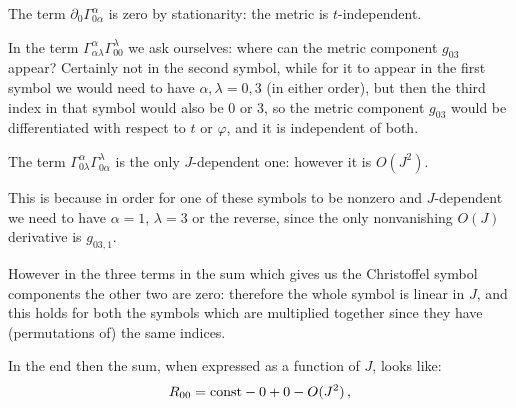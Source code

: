 \documentclass[main.tex]{subfiles}
\begin{document}
The term \(\partial_{0} \Gamma^{\alpha }_{0\alpha }\) is zero by stationarity: the metric is \(t\)-independent. 

In the term \(\Gamma^{\alpha }_{\alpha \lambda } \Gamma^{\lambda }_{00}\) we ask ourselves: where can the metric component \(g_{03}\) appear? Certainly not in the second symbol, while for it to appear in the first symbol we would need to have \(\alpha, \lambda = 0, 3\) (in either order), but then the third index in that symbol would also be \(0\) or \(3\), so the metric component \(g_{03}\) would be differentiated with respect to \(t\) or \(\varphi \), and it is independent of both. 

The term \(\Gamma^{\alpha }_{0 \lambda } \Gamma^{\lambda}_{0 \alpha }\) is the only \(J\)-dependent one: however it is \(O(J^2)\). 

This is because in order for one of these symbols to be nonzero and \(J\)-dependent we need to have \(\alpha = 1\), \(\lambda = 3\) or the reverse, since the only nonvanishing \(O(J)\) derivative is \(g_{03,1}\). 

However in the three terms in the sum which gives us the Christoffel symbol components the other two are zero: therefore the whole symbol is linear in \(J\), and this holds for both the symbols which are multiplied together since they have (permutations of) the same indices. 

In the end then the sum, when expressed as a function of \(J\), looks like: 
%
\begin{align}
  R_{00} = \text{const} - 0 + 0 - O(J^2)
\,,
\end{align}
%
\end{document}
